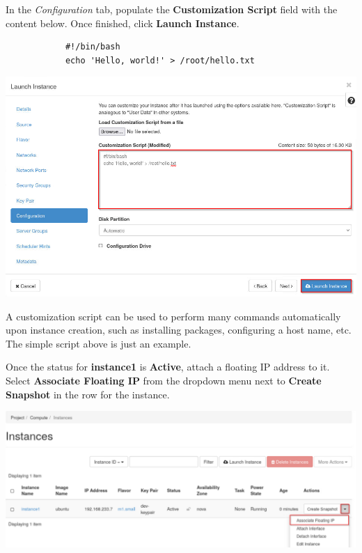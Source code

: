 \documentclass[letterpaper, 12pt]{article}
\begin{document}
\begin{enumerate}
    \begin{labstep}
        In the \textit{Configuration} tab, populate the \textbf{Customization Script} field with the content below.
        Once finished, click \textbf{Launch Instance}.
        \begin{lstlisting}
            #!/bin/bash
            echo 'Hello, world!' > /root/hello.txt
        \end{lstlisting}

        \begin{center}
            \includegraphics[width=\linewidth]{images/part2/step10.png}
        \end{center}
    \end{labstep}

    \begin{tipbox}
        A customization script can be used to perform many commands automatically upon instance creation, such as installing packages, configuring a host name, etc.
        The simple script above is just an example.
    \end{tipbox}

    \begin{labstep}
        Once the status for \textbf{instance1} is \textbf{Active}, attach a floating IP address to it.
        Select \textbf{Associate Floating IP} from the dropdown menu next to \textbf{Create Snapshot} in the row for the instance.

        \begin{center}
            \includegraphics[width=\linewidth]{images/part2/step11.png}
        \end{center}
    \end{labstep}


\end{enumerate}
\end{document}
